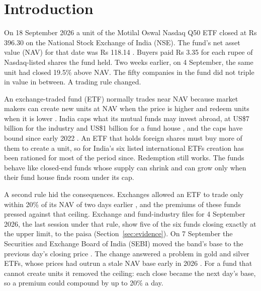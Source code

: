 \documentclass[11pt,a4paper]{article}
\theoremstyle{definition}
\begin{document}
\begin{titlepage}
\begin{quote}
\end{quote}
\vspace{0.3cm}
\vspace{0.15cm}
\end{titlepage}
\setcounter{page}{1}

\section{Introduction}
On 18 September 2026 a unit of the Motilal Oswal Nasdaq Q50 ETF closed at Rs 396.30 on the National Stock Exchange of India (NSE). The fund's net asset value (NAV) for that date was Rs 118.14 \citep{indmoney2026unwind}. Buyers paid Rs 3.35 for each rupee of Nasdaq-listed shares the fund held. Two weeks earlier, on 4 September, the same unit had closed 19.5\% above NAV. The fifty companies in the fund did not triple in value in between. A trading rule changed.

An exchange-traded fund (ETF) normally trades near NAV because market makers can create new units at NAV when the price is higher and redeem units when it is lower \citep{bendavid2017exchange}. India caps what its mutual funds may invest abroad, at US\$7 billion for the industry and US\$1 billion for a fund house \citep{bs2021limit}, and the caps have bound since early 2022 \citep{pti2022resume}. An ETF that holds foreign shares must buy more of them to create a unit, so for India's six listed international ETFs creation has been rationed for most of the period since. Redemption still works. The funds behave like closed-end funds whose supply can shrink and can grow only when their fund house finds room under its cap.

A second rule hid the consequences. Exchanges allowed an ETF to trade only within 20\% of its NAV of two days earlier \citep{sebi2026circular}, and the premiums of these funds pressed against that ceiling. Exchange and fund-industry files for 4 September 2026, the last session under that rule, show five of the six funds closing exactly at the upper limit, to the paisa (Section~\ref{sec:evidence}). On 7 September the Securities and Exchange Board of India (SEBI) moved the band's base to the previous day's closing price \citep{sebi2026circular,sebi2026ext}. The change answered a problem in gold and silver ETFs, whose prices had outrun a stale NAV base early in 2026 \citep{sebi2026cp}. For a fund that cannot create units it removed the ceiling: each close became the next day's base, so a premium could compound by up to 20\% a day.
\end{document}
